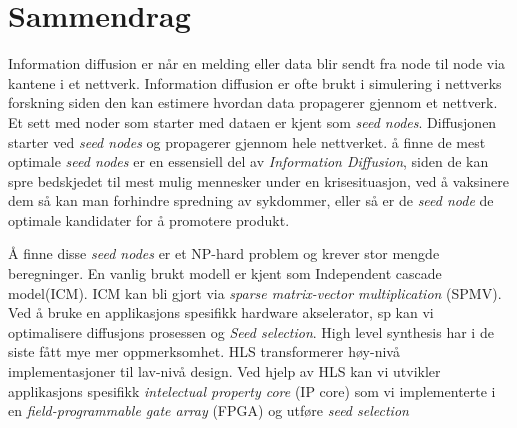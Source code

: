 \chapter*{Sammendrag}
Information diffusion er n\r{a}r en melding eller data blir sendt fra node til node via kantene i et nettverk. Information diffusion er ofte brukt i simulering i nettverks forskning siden den kan estimere hvordan data propagerer gjennom et nettverk. Et sett med noder som starter med dataen er kjent som \textit{seed nodes}. Diffusjonen starter ved \textit{seed nodes} og propagerer gjennom hele nettverket. \r{a} finne de mest optimale \textit{seed nodes} er en essensiell del av \textit{Information Diffusion}, siden de kan spre bedskjedet til mest mulig mennesker under en krisesituasjon, ved \r{a} vaksinere dem s\r{a} kan man forhindre spredning av sykdommer, eller s\r{a} er de \textit{seed node} de optimale kandidater for \r{a} promotere produkt.

\r{A} finne disse \textit{seed nodes} er et NP-hard problem og krever stor mengde beregninger. En vanlig brukt modell er kjent som Independent cascade model(ICM).  ICM kan bli gjort via \textit{sparse matrix-vector multiplication} (SPMV). Ved \r{a} bruke en applikasjons spesifikk hardware akselerator, sp kan vi optimalisere diffusjons prosessen og \textit{Seed selection}.  High level synthesis har i de siste f\r{a}tt mye mer oppmerksomhet. HLS  transformerer h{\o}y-niv\r{a} implementasjoner til lav-niv\r{a} design. Ved hjelp av HLS kan vi utvikler applikasjons spesifikk \textit{intelectual property core} (IP core) som vi implementerte i en \textit{field-programmable gate array} (FPGA) og utf{\o}re \textit{seed selection}
